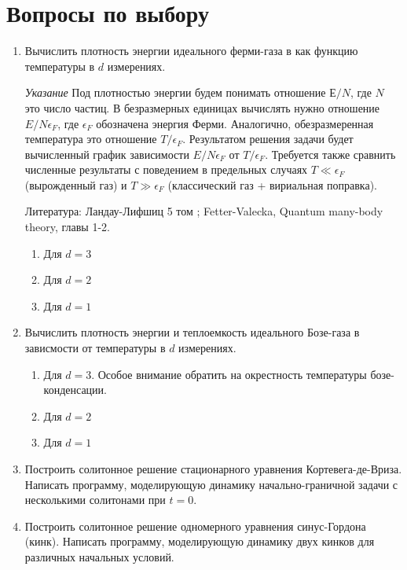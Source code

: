 \documentclass{article}
\begin{document}
\section*{Вопросы по выбору}


\begin{enumerate}

\item Вычислить плотность энергии идеального ферми-газа в как функцию 
температуры в $d$ измерениях.

\textit{Указание} Под плотностью энергии будем понимать отношение $Е/N$, где $N$ это число частиц. В безразмерных единицах вычислять нужно отношение $E/N\epsilon_F$, где $\epsilon_F$ обозначена энергия Ферми. Аналогично, обезразмеренная температура это отношение $T/\epsilon_F$. Результатом решения задачи будет вычисленный график зависимости $E/N\epsilon_F$ от $T/\epsilon_F$. Требуется также сравнить численные результаты с поведением в предельных случаях $T \ll \epsilon_F$ (вырожденный газ) и $T \gg \epsilon_F$ (классический газ + вириальная поправка).

Литература: Ландау-Лифшиц 5 том ; Fetter-Valecka, Quantum many-body theory, главы 1-2.

\begin{enumerate}
\item Для $d = 3$
\item Для $d = 2$
\item Для $d = 1$
\end{enumerate}

\item Вычислить плотность энергии и теплоемкость идеального Бозе-газа в
зависмости от температуры в $d$ измерениях.

\begin{enumerate}
\item Для $d=3$. Особое внимание обратить на окрестность температуры бозе-конденсации.
\item Для $d=2$
\item Для $d=1$
\end{enumerate}

\item Построить солитонное решение стационарного уравнения Кортевега-де-Вриза.
Написать программу, моделирующую динамику начально-граничной задачи с
несколькими солитонами при $t=0$.

\item Построить солитонное решение одномерного уравнения синус-Гордона (кинк).
Написать программу, моделирующую динамику двух кинков для различных начальных
условий.


\end{enumerate}
\end{document}
